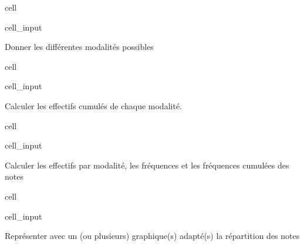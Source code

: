 \documentclass[letterpaper,10pt,french]{sphinxmanual}
\begin{document}
\begin{sphinxuseclass}{cell}
\begin{sphinxuseclass}{cell_input}
\begin{sphinxVerbatim}[commandchars=\\\{\}]
  \PYG{p}{[}                   \PYG{p}{]}
\end{sphinxVerbatim}

\end{sphinxuseclass}
\end{sphinxuseclass}
\sphinxAtStartPar
Donner les différentes modalités possibles

\begin{sphinxuseclass}{cell}
\begin{sphinxuseclass}{cell_input}
\begin{sphinxVerbatim}[commandchars=\\\{\}]
\end{sphinxVerbatim}

\end{sphinxuseclass}
\end{sphinxuseclass}
\sphinxAtStartPar
Calculer les effectifs cumulés de chaque modalité.

\begin{sphinxuseclass}{cell}
\begin{sphinxuseclass}{cell_input}
\begin{sphinxVerbatim}[commandchars=\\\{\}]
\end{sphinxVerbatim}

\end{sphinxuseclass}
\end{sphinxuseclass}
\sphinxAtStartPar
Calculer les effectifs par modalité, les fréquences et les fréquences cumulées des notes

\begin{sphinxuseclass}{cell}
\begin{sphinxuseclass}{cell_input}
\begin{sphinxVerbatim}[commandchars=\\\{\}]
\end{sphinxVerbatim}

\end{sphinxuseclass}
\end{sphinxuseclass}
\sphinxAtStartPar
Représenter avec un (ou plusieurs) graphique(s) adapté(s) la répartition des notes
\end{document}
